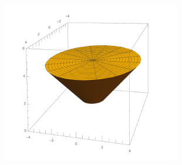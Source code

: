 \documentclass[fleqn]{article}
\begin{document}
\begin{enumerate}
    \begin{center}
      \includegraphics[height=7cm, width=10cm]{second.png}
    \end{center}
  \end{enumerate}
\end{document}
